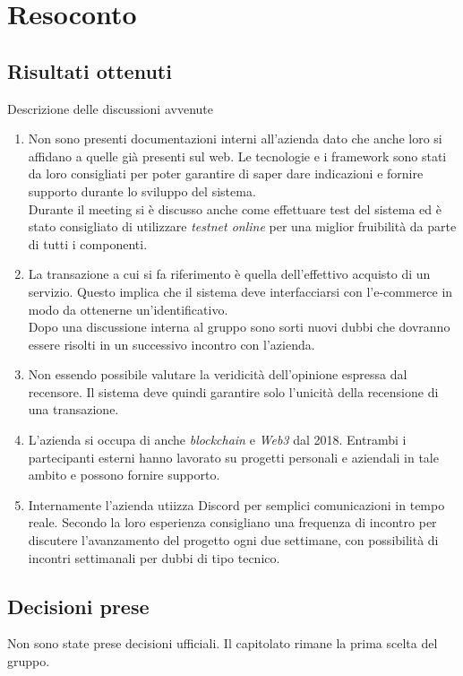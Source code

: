 \section{Resoconto}

\subsection{Risultati ottenuti}
Descrizione delle discussioni avvenute
\begin{enumerate}
    \item Non sono presenti documentazioni interni all'azienda dato che anche loro si affidano a quelle già presenti sul web. Le tecnologie e i framework sono stati da loro consigliati per poter garantire di saper dare indicazioni e fornire supporto durante lo sviluppo del sistema.\\ Durante il meeting si è discusso anche come effettuare test del sistema ed è stato consigliato di utilizzare \emph{testnet online} per una miglior fruibilità da parte di tutti i componenti.
    \item La transazione a cui si fa riferimento è quella dell'effettivo acquisto di un servizio. Questo implica che il sistema deve interfacciarsi con l'e-commerce in modo da ottenerne un'identificativo.\\ Dopo una discussione interna al gruppo sono sorti nuovi dubbi che dovranno essere risolti in un successivo incontro con l'azienda.
    \item Non essendo possibile valutare la veridicità dell'opinione espressa dal recensore. Il sistema deve quindi garantire solo l'unicità della recensione di una transazione.
    \item L'azienda si occupa di anche \emph{blockchain} e \emph{Web3} dal 2018. Entrambi i partecipanti esterni hanno lavorato su progetti personali e aziendali in tale ambito e possono fornire supporto.
    \item Internamente l'azienda utiizza Discord per semplici comunicazioni in tempo reale. Secondo la loro esperienza consigliano una frequenza di incontro per discutere l'avanzamento del progetto ogni due settimane, con possibilità di incontri settimanali per dubbi di tipo tecnico.
\end{enumerate}

\subsection{Decisioni prese}
Non sono state prese decisioni ufficiali. Il capitolato rimane la prima scelta del gruppo.
